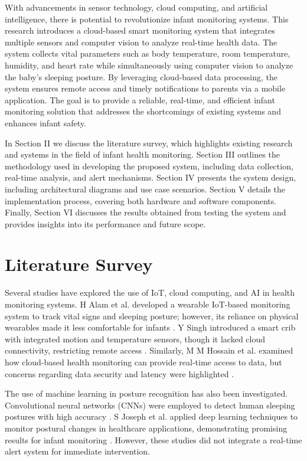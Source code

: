 \documentclass[conference]{IEEEtran}
\begin{document}
    With advancements in sensor technology, cloud computing, and artificial intelligence, there is potential to revolutionize infant monitoring systems. This research introduces a cloud-based smart monitoring system that integrates multiple sensors and computer vision to analyze real-time health data. The system collects vital parameters such as body temperature, room temperature, humidity, and heart rate while simultaneously using computer vision to analyze the baby’s sleeping posture. By leveraging cloud-based data processing, the system ensures remote access and timely notifications to parents via a mobile application. The goal is to provide a reliable, real-time, and efficient infant monitoring solution that addresses the shortcomings of existing systems and enhances infant safety.

    In Section II we discuss the literature survey, which highlights existing research and systems in the field of infant health monitoring. Section III outlines the methodology used in developing the proposed system, including data collection, real-time analysis, and alert mechanisms. Section IV presents the system design, including architectural diagrams and use case scenarios. Section V details the implementation process, covering both hardware and software components. Finally, Section VI discusses the results obtained from testing the system and provides insights into its performance and future scope.
\section{Literature Survey}
Several studies have explored the use of IoT, cloud computing, and AI in health monitoring systems. H Alam et al. developed a wearable IoT-based monitoring system to track vital signs and sleeping posture; however, its reliance on physical wearables made it less comfortable for infants \cite{ref1}. Y Singh introduced a smart crib with integrated motion and temperature sensors, though it lacked cloud connectivity, restricting remote access \cite{ref2}. Similarly, M M Hossain et al. examined how cloud-based health monitoring can provide real-time access to data, but concerns regarding data security and latency were highlighted \cite{ref3}.  

The use of machine learning in posture recognition has also been investigated. Convolutional neural networks (CNNs) were employed to detect human sleeping postures with high accuracy \cite{ref4}. S Joseph et al. applied deep learning techniques to monitor postural changes in healthcare applications, demonstrating promising results for infant monitoring \cite{ref5}. However, these studies did not integrate a real-time alert system for immediate intervention.  
\end{document}

